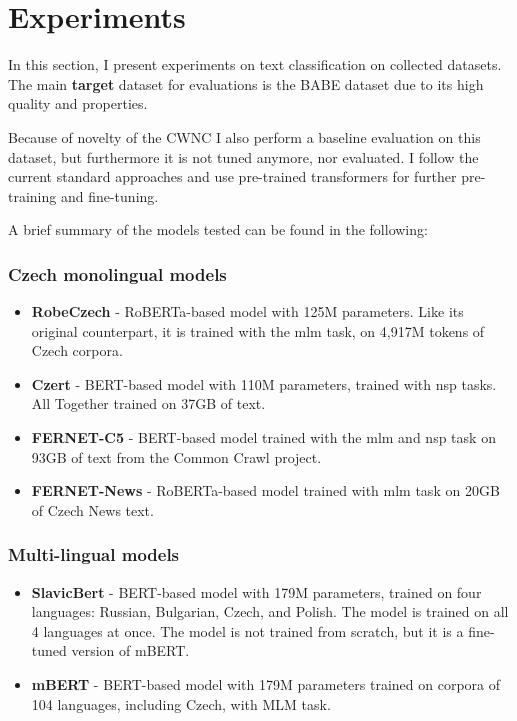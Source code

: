 \chapter{Experiments}\label{experiments}
In this section, I present experiments on text classification on collected datasets. The main \textbf{target} dataset for evaluations is the BABE dataset due to its high quality and properties.

Because of novelty of the CWNC I also perform a baseline evaluation on this dataset, but furthermore it is not tuned anymore, nor evaluated.
I follow the current standard approaches and use pre-trained transformers for further pre-training and fine-tuning. 

A brief summary of the models tested can be found in the following:




\subsection{Czech monolingual models}
\begin{itemize}
    \item \textbf{RobeCzech} \cite{strakarobeczech} - RoBERTa-based model with 125M parameters. Like its original counterpart, it is trained with the \gls{mlm} task, on 4,917M tokens of Czech corpora.
    \item \textbf{Czert} \cite{sido-etal-2021-czert} - BERT-based model with 110M parameters, trained with \gls{nsp} tasks. All Together trained on 37GB of text. 
    \item \textbf{FERNET-C5} \cite{lehevcka2021comparison} - BERT-based model trained with the \gls{mlm} and \gls{nsp} task on 93GB of text from the Common Crawl project.
    \item \textbf{FERNET-News} \cite{lehevcka2021comparison} - RoBERTa-based model trained with \gls{mlm} task on 20GB of Czech News text.
\end{itemize}






\subsection{Multi-lingual models}
\begin{itemize}
    \item \textbf{SlavicBert} \cite{arkhipov2019tuning} - BERT-based model with 179M parameters, trained on four languages: Russian, Bulgarian, Czech, and Polish. The model is trained on all 4 languages at once. The model is not trained from scratch, but it is a fine-tuned version of mBERT.
    \item \textbf{mBERT} - BERT-based model with 179M parameters trained on corpora of 104 languages, including Czech, with MLM task.
\end{itemize}




